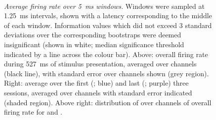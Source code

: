 \begin{figure}[htbp]%
    \centering
    \hspace*{\fill}
    \hspace*{\fill}\hspace{.2cm}\hspace*{\fill}
    \hspace*{\fill}
    \\
    \hspace*{\fill}
    \hspace*{\fill}\hspace{.2cm}\hspace*{\fill}
    \hspace*{\fill}
    \caption{\textit{Average firing rate over \SI{5}{\milli\second} windows.}
Windows were sampled at \SI{1.25}{\milli\second} intervals, shown with a latency corresponding to the middle of each window.
Information values which did not exceed \num{3} standard deviations over the corresponding bootstraps were deemed insignificant (shown in white; median significance threshold indicated by a line across the colour bar).
Above: overall firing rate during \SI{527}{\milli\second} of stimulus presentation, averaged over channels (black line), with standard error over channels shown (grey region).
Right: average over the first (; blue) and last (; purple) three sessions, averaged over channels with standard error indicated (shaded region).
Above right: distribution of over channels of overall firing rate for  and .
    \label{fig:fr_hm}
}
\end{figure}


